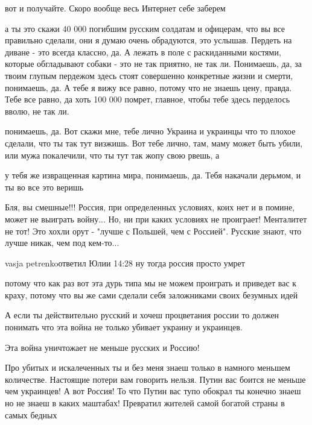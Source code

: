 
вот и получайте. Скоро вообще весь Интернет себе заберем


а ты это скажи 40 000 погибшим русским солдатам и офицерам, что вы все
правильно сделали, они я думаю очень обрадуются, это услышав. Пердеть на диване
- это всегда классно, да. А лежать в поле с раскиданными костями, которые
обгладывают собаки - это не так приятно, не так ли. Понимаешь, да, за твоим
глупым пердежом здесь стоят совершенно конкретные жизни и смерти, понимаешь,
да. А тебе я вижу все равно, потому что не знаешь цену, правда. Тебе все равно,
да хоть 100 000 помрет, главное, чтобы тебе здесь
перделось вволю, не так ли.

понимаешь, да. Вот скажи мне, тебе лично Украина и украинцы что то плохое
сделали, что ты так тут визжишь. Вот тебе лично, там, маму может быть убили,
или мужа покалечили, что ты тут так жопу свою рвешь, а

у тебя же извращенная картина мира, понимаешь, да. Тебя накачали дерьмом, и ты
во все это веришь


Бля, вы смешные!!! Россия, при определенных условиях, коих нет и в помине,
может не выиграть войну... Но, ни при каких условиях не проиграет! Менталитет
не тот! Это хохли орут - "лучше с Польшей, чем с Россией". Русские знают, что
лучше никак, чем под кем-то...

vasja petrenkoответил Юлии
14:28
ну тогда россия просто умрет

потому что как раз вот эта дурь типа мы не можем проиграть и приведет вас к
краху, потому что вы же сами сделали себя заложниками своих безумных идей

А если ты действительно русский и хочеш процветания россии то должен понимать
что эта война не только убивает украину и украинцев.

Эта война уничтожает не меньше русских и Россию!

Про убитых и искалеченных ты и без меня знаеш только в намного меньшем
количестве. Настоящие потери вам говорить нельзя. Путин вас боится не меньше
чем украинцев! А вот Россия! То что Путин вас тупо обокрал ты конечно знаеш но
не знаеш в каких маштабах! Превратил жителей самой богатой страны в самых
бедных

